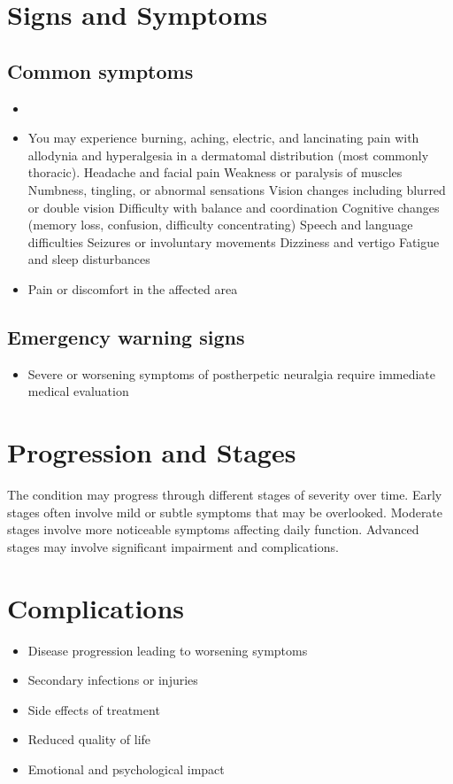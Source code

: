 \section{Signs and Symptoms}
\subsection{Common symptoms}
\begin{itemize}[noitemsep]
  \item \item You may experience burning, aching, electric, and lancinating pain with allodynia and hyperalgesia in a dermatomal distribution (most commonly thoracic). Headache and facial pain Weakness or paralysis of muscles Numbness, tingling, or abnormal sensations Vision changes including blurred or double vision Difficulty with balance and coordination Cognitive changes (memory loss, confusion, difficulty concentrating) Speech and language difficulties Seizures or involuntary movements Dizziness and vertigo Fatigue and sleep disturbances
  \item Pain or discomfort in the affected area
  \end{itemize}
\subsection{Emergency warning signs}
\begin{itemize}[noitemsep]
  \item Severe or worsening symptoms of postherpetic neuralgia require immediate medical evaluation
\end{itemize}
\section{Progression and Stages}
The condition may progress through different stages of severity over time. Early stages often involve mild or subtle symptoms that may be overlooked. Moderate stages involve more noticeable symptoms affecting daily function. Advanced stages may involve significant impairment and complications.
\section{Complications}
\begin{itemize}[noitemsep]
  \item Disease progression leading to worsening symptoms
  \item Secondary infections or injuries
  \item Side effects of treatment
  \item Reduced quality of life
  \item Emotional and psychological impact
\end{itemize}
